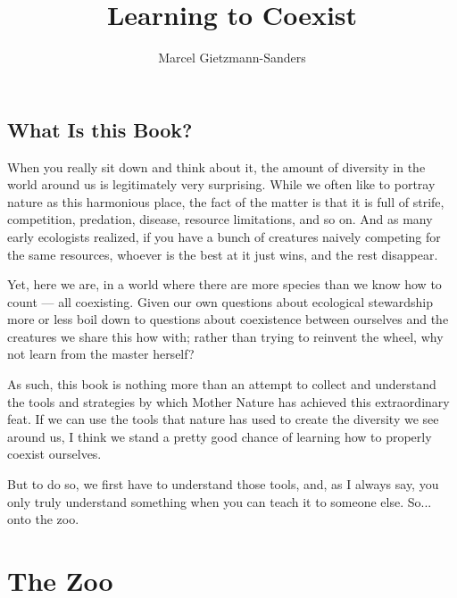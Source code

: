 \documentclass[11pt,a5paper]{book}
\title{Learning to Coexist}
\author{Marcel Gietzmann-Sanders}
\date{}
\begin{document}
\maketitle
\tableofcontents
\newpage
\chapter{What Is this Book?}

When you really sit down and think about it, the amount of diversity in the world around us is legitimately very surprising. While we often like to portray nature as this harmonious place, the fact of the matter is that it is full of strife, competition, predation, disease, resource limitations, and so on. And as many early ecologists realized, if you have a bunch of creatures naively competing for the same resources, whoever is the best at it just wins, and the rest disappear.

Yet, here we are, in a world where there are more species than we know how to count — all coexisting. Given our own questions about ecological stewardship more or less boil down to questions about coexistence between ourselves and the creatures we share this how with; rather than trying to reinvent the wheel, why not learn from the master herself? \newline

As such, this book is nothing more than an attempt to collect and understand the tools and strategies by which Mother Nature has achieved this extraordinary feat. If we can use the tools that nature has used to create the diversity we see around us, I think we stand a pretty good chance of learning how to properly coexist ourselves.

But to do so, we first have to understand those tools, and, as I always say, you only truly understand something when you can teach it to someone else. So... onto the zoo. 

\part{The Zoo}
\end{document}
